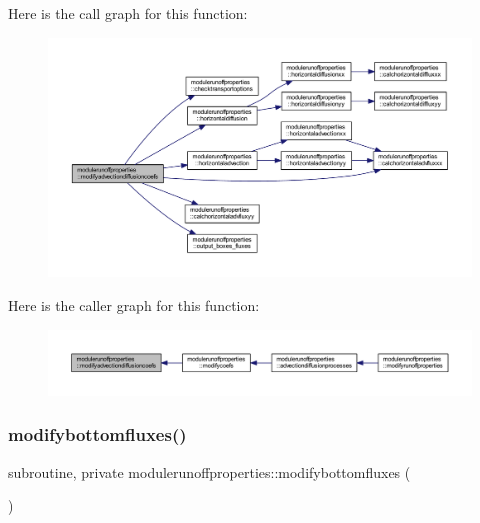 Here is the call graph for this function\+:\nopagebreak
\begin{figure}[H]
\begin{center}
\leavevmode
\includegraphics[width=350pt]{namespacemodulerunoffproperties_ae48417d5192871ed023a556976f13a89_cgraph}
\end{center}
\end{figure}
Here is the caller graph for this function\+:\nopagebreak
\begin{figure}[H]
\begin{center}
\leavevmode
\includegraphics[width=350pt]{namespacemodulerunoffproperties_ae48417d5192871ed023a556976f13a89_icgraph}
\end{center}
\end{figure}
\mbox{\label{namespacemodulerunoffproperties_a2c67e89cd73897e22e4941c034891418}} 
\subsubsection{\texorpdfstring{modifybottomfluxes()}{modifybottomfluxes()}}
{\footnotesize\ttfamily subroutine, private modulerunoffproperties\+::modifybottomfluxes (\begin{DoxyParamCaption}{ }\end{DoxyParamCaption})\hspace{0.3cm}{\ttfamily [private]}}

